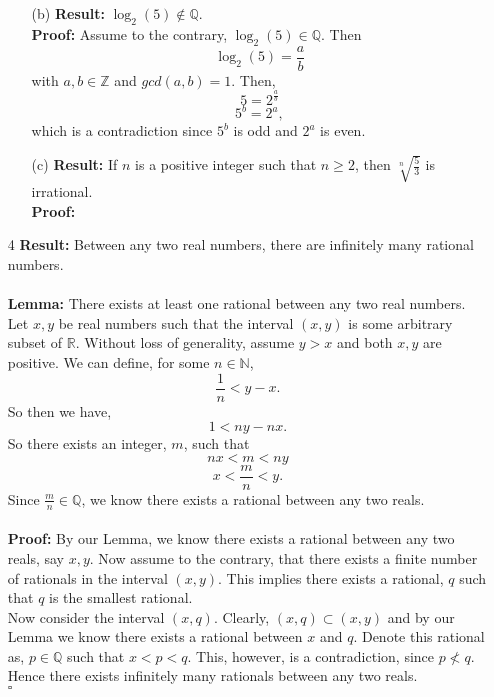 \documentclass[12pt]{article}
\begin{document}
\begin{enumerate}
\begin{enumerate}
                \item [(b)] \textbf{Result: }$\log_{2}(5)\notin\mathbb{Q}$. \\
                \textbf{Proof: } Assume to the contrary, $\log_{2}(5)\in\mathbb{Q}$. Then $$ \log_{2}(5) =\frac{a}{b}$$ with $a,b\in\mathbb{Z}$ and $gcd(a,b)=1$. Then, 
                $$ 5=2^{\frac{a}{b}}$$
                $$5^b=2^a,$$
                which is a contradiction since $5^b$ is odd and $2^a$ is even. 
                
                \item [(c)] \textbf{Result: }If $n$ is a positive integer such that $n\ge 2$, then $\sqrt[n]{\frac{5}{3}}$ is irrational. \\
                \textbf{Proof: } 

            \end{enumerate}
            
        \item [4] 
            \textbf{Result: }Between any two real numbers, there are          infinitely many rational numbers. \\\\
            \textbf{Lemma: }There exists at least one rational between any two real numbers. \\
            Let $x,y$ be real numbers such that the interval $(x,y)$ is some arbitrary subset of $\mathbb{R}$. Without loss of generality, assume $y>x$ and both $x,y$ are positive. We can define, for some $n\in\mathbb{N}$,
            $$\frac{1}{n}<y-x.$$
            So then we have,  
            $$1<ny-nx.$$ 
            So there exists an integer, $m$, such that
            $$nx<m<ny$$
            $$x<\frac{m}{n}<y.$$
            Since $\frac{m}{n}\in\mathbb{Q}$, we know there exists a rational between any two reals. \\\\
            \textbf{Proof: }By our Lemma, we know there exists a rational between any two reals, say $x,y$. Now assume to the contrary, that there exists a finite number of rationals in the interval $(x,y)$. This implies there exists a rational, $q$ such that $q$ is the smallest rational. \\
            Now consider the interval $(x,q)$. Clearly, $(x,q)\subset{(x,y)}$ and by our Lemma we know there exists a rational between $x$ and $q$. Denote this rational as,  $p\in\mathbb{Q}$ such that $x<p<q$. This, however, is a contradiction, since $p\nless q$. Hence there exists infinitely many rationals between any two reals. \\
            $\square$
            

\end{enumerate}
\end{document}
